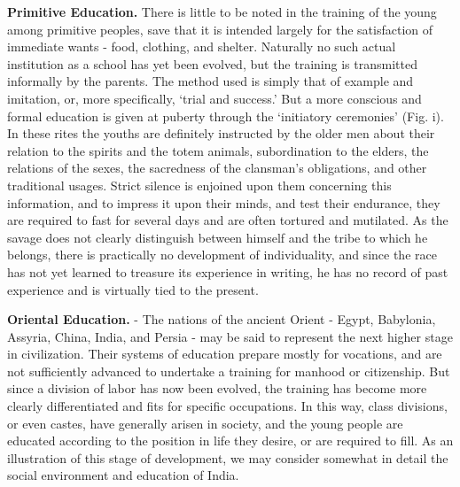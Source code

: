 \documentclass[
]{book}
\begin{document}
\textbf{Primitive Education.} There is little to be noted in the training of the young among primitive peoples, save that it is intended largely for the satisfaction of immediate wants - food, clothing, and shelter. Naturally no such actual institution as a school has yet been evolved, but the training is transmitted informally by the parents. The method used is simply that of example and imitation, or, more specifically, `trial and success.' But a more conscious and formal education is given at puberty through the `initiatory ceremonies' (Fig. i). In these rites the youths are definitely instructed by the older men about their relation to the spirits and the totem animals, subordination to the elders, the relations of the sexes, the sacredness of the clansman's obligations, and other traditional usages. Strict silence is enjoined upon them concerning this information, and to impress it upon their minds, and test their endurance, they are required to fast for several days and are often tortured and mutilated. As the savage does not clearly distinguish between himself and the tribe to which he belongs, there is practically no development of individuality, and since the race has not yet learned to treasure its experience in writing, he has no record of past experience and is virtually tied to the present.

\textbf{Oriental Education.} - The nations of the ancient Orient - Egypt, Babylonia, Assyria, China, India, and Persia - may be said to represent the next higher stage in civilization. Their systems of education prepare mostly for vocations, and are not sufficiently advanced to undertake a training for manhood or citizenship. But since a division of labor has now been evolved, the training has become more clearly differentiated and fits for specific occupations. In this way, class divisions, or even castes, have generally arisen in society, and the young people are educated according to the position in life they desire, or are required to fill. As an illustration of this stage of development, we may consider somewhat in detail the social environment and education of India.
\end{document}
